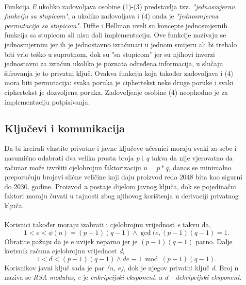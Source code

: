 \paragraph*{}
Funkcija \textit{E} ukoliko zadovoljava osobine (1)-(3) predstavlja tzv. \textit{"jednosmjernu funkciju sa stupicom"}, a ukoliko zadovoljava i (4) onda je \textit{"jednosmjerna permutacija sa stupicom"}. Diffie i Hellman\cite{diffie1976new} uveli su koncepte jednosmjernih funkcija sa stupicom ali nisu dali implementaciju. Ove funkcije nazivaju se jednosmjernim jer ih je jednostavno izračunati u jednom smijeru ali bi trebalo biti vrlo teško u suprotnom, dok su "sa stupicom" jer su njihovi inverzi jednostavni za izračun ukoliko je poznata određena informacija, u slučaju šifrovanja je to privatni ključ. Ovakva funkcija koja također zadovoljava i (4) mora biti permutacija: svaka poruka je ciphertekst neke druge poruke i svaki ciphertekst je dozvoljena poruka. Zadovoljenje osobine (4) neophodno je za implementaciju potpisivanja.

\subsection{Ključevi i komunikacija} \label{subs:keygen}
Da bi kreirali vlastite privatne i javne ključeve učesnici moraju svaki za sebe i nasumično odabrati dva velika prosta broja \textit{p} i \textit{q} takva da nije vjerovatno da računar može izvršiti cjelobrojnu faktorizaciju \(n = p * q\), danas se minimalno preporučuju brojevi slične veličine koji daju proizvod reda 2048 bita kao sigurni do 2030. godine\cite{kaliski2003twirl}. Proizvod \textit{n} postaje dijelom javnog ključa, dok se pojedinačni faktori moraju čuvati u tajnosti zbog njihovog korištenja u derivaciji privatnog ključa.

\paragraph*{}
Korisnici također moraju izabrati i cjelobrojnu vrijednost \textit{e} takvu da, \[1 < e < \phi(n) = (p - 1)(q - 1) \wedge \gcd(e, (p - 1)(q - 1) = 1.\] Obratite pažnju da je e uvijek neparno jer je \((p - 1)(q - 1)\) parno. Dalje korisnik računa cjelobrojnu vrijednost \textit{d}, \[1 < d < (p - 1)(q - 1) \wedge de \equiv 1\bmod(p - 1)(q - 1).\] Korisnikov javni ključ sada je par \textit{(n, e)}, dok je njegov privatni ključ \textit{d}. Broj n naziva se \textit{RSA modulus}, \textit{e} je \textit{enkripcijski eksponent}, a \textit{d - dekripcijski eksponent}\cite{buchmann2013introduction}.

